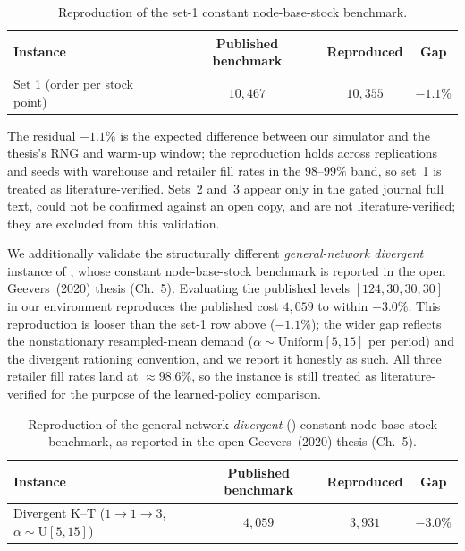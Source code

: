 \documentclass[11pt]{article}
\begin{document}
\begin{table}[!htbp]
\centering
\caption{Reproduction of the \citet{geevers2024cardboard} set-1 constant node-base-stock benchmark.}
\label{tab:general-backorder-validation}
\begin{tabular}{lccc}
\toprule
Instance & Published benchmark & Reproduced & Gap \\
\midrule
Set 1 (order per stock point) & $10{,}467$ & $10{,}355$ & $-1.1\%$ \\
\bottomrule
\end{tabular}
\end{table}
\FloatBarrier

The residual $-1.1\%$ is the expected difference between our simulator and the thesis's RNG and
warm-up window; the reproduction holds across replications and seeds with warehouse and retailer fill
rates in the $98$--$99\%$ band, so set~1 is treated as literature-verified. Sets~2 and~3 appear only
in the gated journal full text, could not be confirmed against an open copy, and are not
literature-verified; they are excluded from this validation.

We additionally validate the structurally different \emph{general-network divergent} instance of
\citet{kunnumkal2011}, whose constant node-base-stock benchmark is reported in the open Geevers~(2020)
thesis (Ch.~5). Evaluating the published levels $[124,30,30,30]$ in our environment reproduces the
published cost $4{,}059$ to within $-3.0\%$. This reproduction is looser than the set-1 row above
($-1.1\%$); the wider gap reflects the nonstationary resampled-mean demand
($\alpha\sim\mathrm{Uniform}[5,15]$ per period) and the divergent rationing convention, and we report
it honestly as such. All three retailer fill rates land at $\approx 98.6\%$, so the instance is still
treated as literature-verified for the purpose of the learned-policy comparison.

\begin{table}[!htbp]
\centering
\caption{Reproduction of the general-network \emph{divergent} (\citealp{kunnumkal2011}) constant
node-base-stock benchmark, as reported in the open Geevers~(2020) thesis (Ch.~5).}
\label{tab:divergent-kt-validation}
\begin{tabular}{lccc}
\toprule
Instance & Published benchmark & Reproduced & Gap \\
\midrule
Divergent K--T ($1{\to}1{\to}3$, $\alpha\sim\mathrm{U}[5,15]$) & $4{,}059$ & $3{,}931$ & $-3.0\%$ \\
\bottomrule
\end{tabular}
\end{table}
\FloatBarrier
\end{document}
